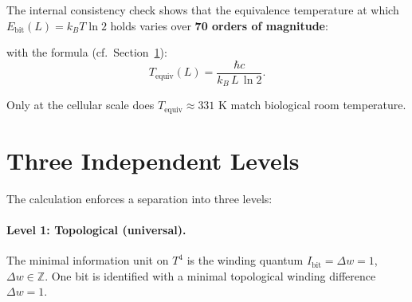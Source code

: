 The internal consistency check shows that the equivalence temperature
at which \(E_\text{bit}(L) = k_B T \ln 2\) holds
varies over \textbf{70 orders of magnitude}:

\begin{center}
\renewcommand{\arraystretch}{1.4}
\end{center}

with the formula (cf.\ Section~\ref{sec:three}):
\begin{equation}
  T_\text{equiv}(L) = \frac{\hbar c}{k_B \, L \, \ln 2}.
  \label{eq:Tequiv}
\end{equation}

Only at the cellular scale does \(T_\text{equiv} \approx 331\) K
match biological room temperature.

\section{Three Independent Levels}
\label{sec:three}

The calculation enforces a separation into three levels:

\paragraph{Level 1: Topological (universal).}

\begin{definition}
The minimal information unit on \(T^4\) is the winding quantum
\(I_\text{bit} = \Delta w = 1\), \(\Delta w \in \mathbb{Z}\).
One bit is identified with a minimal topological winding difference
\(\Delta w = 1\).
\end{definition}


